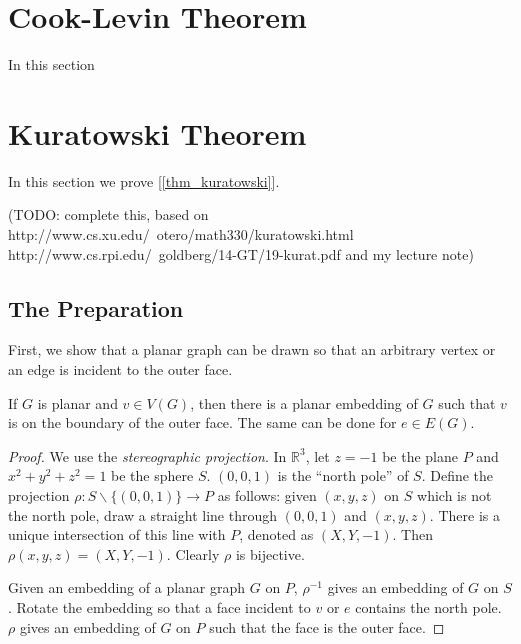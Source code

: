 

    \section{Cook-Levin Theorem}
        In this section
    
    \section{Kuratowski Theorem}
        In this section we prove [\ref{thm_kuratowski}].
        
        (TODO: complete this, based on http://www.cs.xu.edu/~otero/math330/kuratowski.html http://www.cs.rpi.edu/~goldberg/14-GT/19-kurat.pdf and my lecture note)
    
    \subsection{The Preparation}
    
        First, we show that a planar graph can be drawn so that an arbitrary vertex or an edge is incident to the outer face.
    
        \begin{lemma} \label{lem_stereographic}
            If $G$ is planar and $v \in V(G)$, then there is a planar embedding of $G$ such that $v$ is on the boundary of the outer face. The same can be done for $e \in E(G)$.
        \end{lemma}
        
        \begin{proof}
            We use the \emph{stereographic projection}. In $\mathbb{R}^3$, let $z=-1$ be the plane $P$ and $x^2+y^2+z^2=1$ be the sphere $S$. $(0,0,1)$ is the ``north pole'' of $S$. Define the projection $\rho: S \backslash \{(0,0,1)\} \rightarrow P$ as follows: given $(x,y,z)$ on $S$ which is not the north pole, draw a straight line through $(0,0,1)$ and $(x,y,z)$. There is a unique intersection of this line with $P$, denoted as $(X,Y,-1)$. Then $\rho(x,y,z)=(X,Y,-1)$. Clearly $\rho$ is bijective.
            
            Given an embedding of a planar graph $G$ on $P$, $\rho^{-1}$ gives an embedding of $G$ on $S$. Rotate the embedding so that a face incident to $v$ or $e$ contains the north pole. $\rho$ gives an embedding of $G$ on $P$ such that the face is the outer face.
        \end{proof}
        
